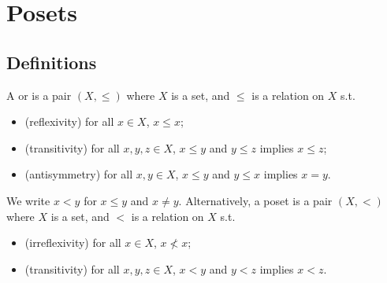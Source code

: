 \section{Posets}

\subsection{Definitions}
\begin{definition}[Poset]
    A  or  is a pair $(X, \leq)$ where $X$ is a set, and $\leq$ is a relation on $X$ s.t.
    \begin{itemize}
        \item (reflexivity) for all $x \in X$, $x \leq x$;
        \item (transitivity) for all $x, y, z \in X$, $x \leq y$ and $y \leq z$ implies $x \leq z$;
        \item (antisymmetry) for all $x, y \in X$, $x \leq y$ and $y \leq x$ implies $x = y$.
    \end{itemize}
\end{definition}

We write $x < y$ for $x \leq y$ and $x \neq y$.
Alternatively, a poset is a pair $(X, <)$ where $X$ is a set, and $<$ is a relation on $X$ s.t.

\begin{itemize}
    \item (irreflexivity) for all $x \in X$, $x \not < x$;
    \item (transitivity) for all $x, y, z \in X$, $x < y$ and $y < z$ implies $x < z$.
\end{itemize}

